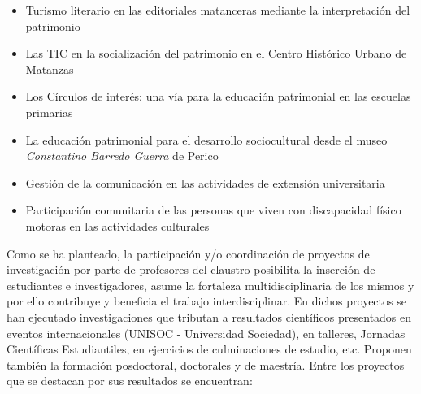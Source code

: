 \begin{itemize}
	\setlength\itemsep{-0.5em}
	\item Turismo literario en las editoriales matanceras mediante la interpretación del patrimonio 
	\item Las TIC en la socialización del patrimonio en el Centro Histórico Urbano de Matanzas
	\item Los Círculos de interés: una vía para la educación patrimonial en las escuelas primarias
	\item La educación patrimonial para el desarrollo sociocultural desde el museo \emph{Constantino Barredo Guerra} de Perico
	\item Gestión de la comunicación en las actividades de extensión universitaria
	\item Participación comunitaria de las personas que viven con discapacidad físico motoras en las actividades culturales
\end{itemize}

Como se ha planteado, la participación y/o coordinación de proyectos de investigación por parte de profesores del claustro posibilita la inserción de estudiantes e investigadores, asume la fortaleza multidisciplinaria de los mismos y por ello contribuye y beneficia el trabajo interdisciplinar. En dichos proyectos se han ejecutado investigaciones que tributan a resultados científicos presentados en eventos internacionales (UNISOC - Universidad Sociedad), en talleres, Jornadas Científicas Estudiantiles, en ejercicios de culminaciones de estudio, etc. Proponen también la formación posdoctoral, doctorales y de maestría. Entre los proyectos que se destacan por sus resultados se encuentran:

